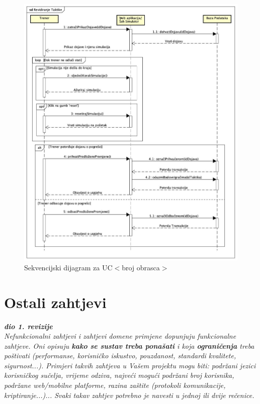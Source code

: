 				
				\begin{figure}[H]
					\centerfloat
        					\includegraphics[scale=0.46]{dijagrami/RevidiranjeTaktike.jpg} %
        					\caption{Sekvencijski dijagram za UC$<$broj obrasca$>$}
        					\label{fig:UC$<$broj obrasca$>$}
				\end{figure}
				
				\eject
	
		\section{Ostali zahtjevi}
		
			\textbf{\textit{dio 1. revizije}}\\
			
			\textit{Nefunkcionalni zahtjevi i zahtjevi domene primjene dopunjuju funkcionalne zahtjeve. Oni opisuju \textbf{kako se sustav treba ponašati} i koja \textbf{ograničenja} treba poštivati (performanse, korisničko iskustvo, pouzdanost, standardi kvalitete, sigurnost...). Primjeri takvih zahtjeva u Vašem projektu mogu biti: podržani jezici korisničkog sučelja, vrijeme odziva, najveći mogući podržani broj korisnika, podržane web/mobilne platforme, razina zaštite (protokoli komunikacije, kriptiranje...)... Svaki takav zahtjev potrebno je navesti u jednoj ili dvije rečenice.}
			
